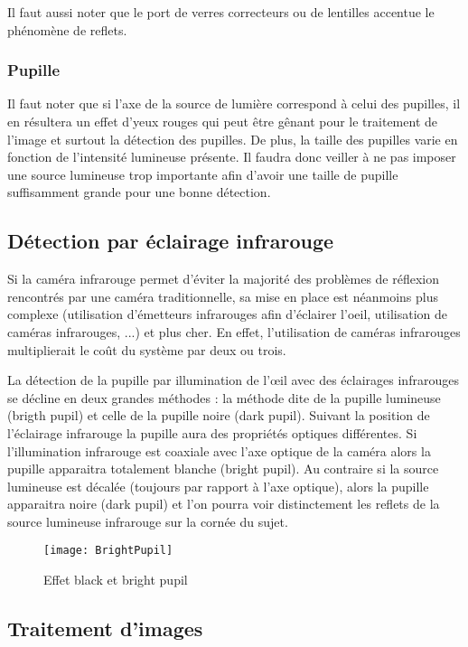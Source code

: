 Il faut aussi noter que le port de verres correcteurs ou de lentilles accentue le phénomène de reflets.

\subsubsection{Pupille}

Il faut noter que si l’axe de la source de lumière correspond à celui des pupilles, il en résultera un effet d’yeux rouges qui peut être gênant pour le traitement de l’image et surtout la détection des pupilles. De plus, la taille des pupilles varie en fonction de l’intensité lumineuse présente. Il faudra donc veiller à ne pas imposer une source lumineuse trop importante afin d’avoir une taille de pupille suffisamment grande pour une bonne détection.

\subsection{Détection par éclairage infrarouge}
\label{EclInfra}

Si la caméra infrarouge permet d’éviter la majorité des problèmes de réflexion rencontrés par une caméra traditionnelle, sa mise en place est néanmoins plus complexe (utilisation d’émetteurs infrarouges afin d'éclairer l'oeil, utilisation de caméras infrarouges, ...) et plus cher. En effet, l'utilisation de caméras infrarouges multiplierait le coût du système par deux ou trois.

La détection de la pupille par illumination de l’œil avec des éclairages infrarouges se décline en deux grandes méthodes : la méthode dite de la pupille lumineuse (brigth pupil) et celle de la pupille noire (dark pupil). Suivant la position de l’éclairage infrarouge la pupille aura des propriétés optiques différentes. Si l’illumination infrarouge est coaxiale avec l’axe optique de la caméra alors la pupille apparaitra totalement blanche (bright pupil). Au contraire si la source lumineuse est décalée (toujours par rapport à l’axe optique), alors la pupille apparaitra noire (dark pupil) et l’on pourra voir distinctement les reflets de la source lumineuse infrarouge sur la cornée du sujet.

\begin{figure}[H]
  \centering
  \texttt{[image: BrightPupil]}
  \caption{Effet black et bright pupil}
  \label{fig:BrightPupil}
\end{figure}

\subsection{Traitement d’images}

